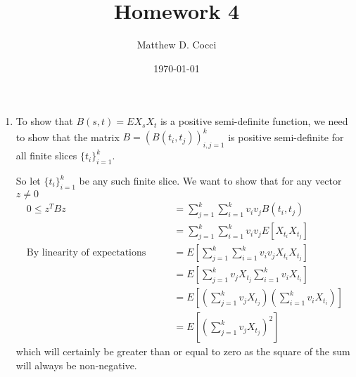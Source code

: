 \documentclass[12pt]{article}
\author{Matthew D. Cocci}
\title{Homework 4}
\date{\today}
\theoremstyle{plain}
\theoremstyle{definition}
\theoremstyle{remark}
\begin{document}
\maketitle


\begin{enumerate}
  \item %
    To show that $B(s,t)=EX_sX_t$ is a positive semi-definite function,
    we need to show that the matrix $B =
    \left(B(t_i,t_j)\right)_{i,j=1}^k$ is positive semi-definite for all
    finite slices $\{t_i\}_{i=1}^k$.

    So let $\{t_i\}_{i=1}^k$ be any such finite slice. We want to show
    that for any vector $z\neq 0$
    \begin{align*}
      0 \leq z^T B z
      &= \sum^k_{j=1} \sum^k_{i=1} v_i v_j B(t_i,t_j)\\
      &= \sum^k_{j=1} \sum^k_{i=1} v_i v_j E[X_{t_i}X_{t_j}]\\
      \text{By linearity of expectations} \qquad
      &= E\left[\sum^k_{j=1} \sum^k_{i=1} v_i v_j X_{t_i}X_{t_j}\right]\\
      &= E\left[\sum^k_{j=1} v_j X_{t_j} \sum^k_{i=1} v_i
          X_{t_i}\right]\\
      &= E\left[\left(\sum^k_{j=1} v_j X_{t_j}\right)
          \left( \sum^k_{i=1} v_i X_{t_i}\right)\right]\\
      &= E\left[\left(\sum^k_{j=1} v_j X_{t_j}\right)^2 \right]
    \end{align*}
    which will certainly be greater than or equal to zero as the square
    of the sum will always be non-negative.


\end{enumerate}
\end{document}
